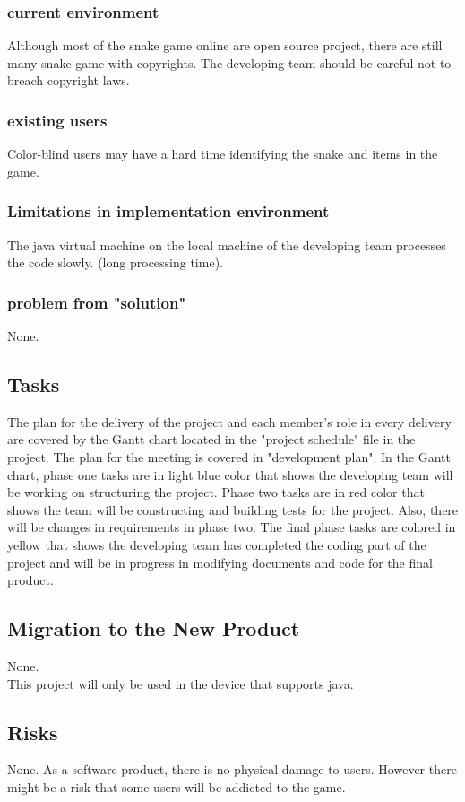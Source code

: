 \documentclass[12pt, titlepage]{article}
\begin{document}
\subsubsection{current environment}
    Although most of the snake game online are open source project, there are still many snake game with copyrights. The developing team should be careful not to breach copyright laws.
\subsubsection{existing users}
    Color-blind users may have a hard time identifying the snake and items in the game.
\subsubsection{Limitations in implementation environment}
    The java virtual machine on the local machine of the developing team processes the code slowly. (long processing time).
\subsubsection{problem from "solution"}
    None.
\subsection{Tasks}
    The plan for the delivery of the project and each member's role in every delivery are covered by the Gantt chart located in the "project schedule" file in the project. The plan for the meeting is covered in "development plan". In the Gantt chart, phase one tasks are in light blue color that shows the developing team will be working on structuring the project. Phase two tasks are in red color that shows the team will be constructing and building tests for the project. Also, there will be changes in requirements in phase two. The final phase tasks are colored in yellow that shows the developing team has completed the coding part of the project and will be in progress in modifying documents and code for the final product.

\subsection{Migration to the New Product}
    None.\\This project will only be used in the device that supports java.
\subsection{Risks}
    None. As a software product, there is no physical damage to users. However there might be a risk that some users will be addicted to the game.
\end{document}

